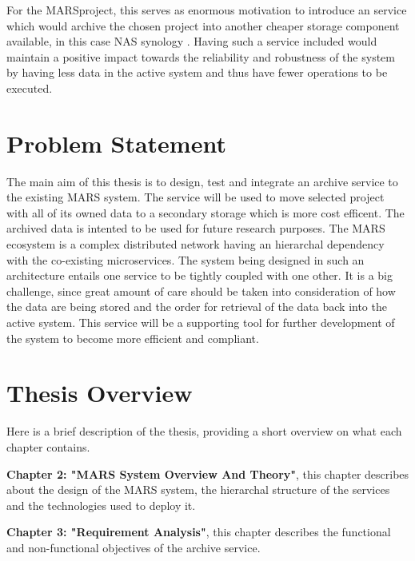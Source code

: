     For the MARS\footnotemark[\value{footnote}] project, this serves as enormous
    motivation to introduce an service which would archive the chosen project
    into another cheaper storage component available, in this case NAS synology 
    \cite{Synology}. Having such a service included would maintain a positive impact 
    towards the reliability and robustness of the system by having less data in the 
    active system and thus have fewer operations to be executed.
    


    \section{Problem Statement}

    The main aim of this thesis is to design, test and integrate an archive service
    to the existing MARS system. The service will be used to move selected project with all of its
    owned data to a secondary storage which is more cost efficent. The archived data is intented 
    to be used for future research purposes.
    The MARS ecosystem is a complex distributed network having an
    hierarchal dependency with the co-existing microservices. The system being designed
    in such an architecture entails one service to be tightly coupled with one other. It is 
    a big challenge, since great amount of care should be taken into consideration of how the 
    data are being stored and the order for retrieval of the data back into the active system.
    This service will be a supporting tool for further development of the system to become more 
    efficient and compliant. 

    \section{Thesis Overview}
        Here is a brief description of the thesis, providing a short overview on what each
        chapter contains.
        
        \par
        \textbf{Chapter 2: "MARS System Overview And Theory"}, this chapter describes about the design
        of the MARS system, the hierarchal structure of the services and the technologies used to
        deploy it.

        \par
        \textbf{Chapter 3: "Requirement Analysis"}, this chapter describes the functional and
        non-functional objectives of the archive service.

